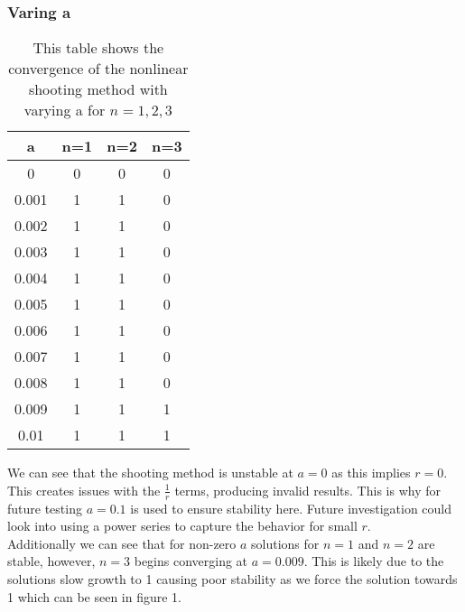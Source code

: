 \documentclass{article}
\begin{document}
\subsubsection{Varing a}
\begin{table}[H]
\centering
\caption{This table shows the convergence of the nonlinear shooting method with varying a for $n=1,2,3$}
\begin{tabular}{|c|c|c|c|}
\hline
a & n=1 & n=2 & n=3 \\
\hline
0 & 0 & 0 & 0\\
0.001 & 1 & 1 & 0\\
0.002 & 1 & 1 & 0\\
0.003 & 1 & 1 & 0\\
0.004 & 1 & 1 & 0\\
0.005 & 1 & 1 & 0\\
0.006 & 1 & 1 & 0\\
0.007 & 1 & 1 & 0\\
0.008 & 1 & 1 & 0\\
0.009 & 1 & 1 & 1\\
0.01  & 1 & 1 & 1\\
\hline
\end{tabular}
\end{table}
We can see that the shooting method is unstable at $a=0$ as this implies $r=0$. This creates issues with the $\frac{1}{r}$ terms, producing invalid results. This is why for future testing $a=0.1$ is used to ensure stability here. Future investigation could look into using a power series to capture the behavior for small $r$. \\
Additionally we can see that for non-zero $a$ solutions for $n=1$ and $n=2$ are stable, however, $n=3$ begins converging at $a=0.009$. This is likely due to the solutions slow growth to 1 causing poor stability as we force the solution towards 1 which can be seen in figure 1. 
\end{document}

